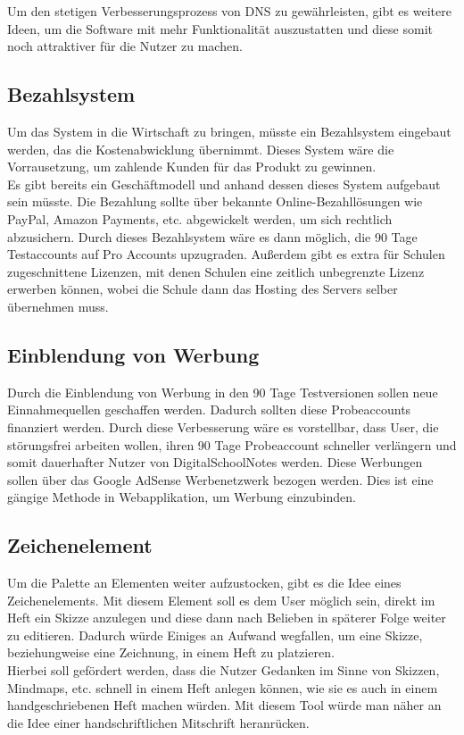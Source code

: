 Um den stetigen Verbesserungsprozess von DNS zu gewährleisten, gibt es weitere Ideen, um die Software mit mehr Funktionalität auszustatten und diese somit noch attraktiver für die Nutzer zu machen. 

\subsection{Bezahlsystem}
Um das System in die Wirtschaft zu bringen, müsste ein Bezahlsystem eingebaut werden, das die Kostenabwicklung übernimmt. Dieses System wäre die Vorrausetzung, um zahlende Kunden für das Produkt zu gewinnen.\\
Es gibt bereits ein Geschäftmodell und anhand dessen dieses System aufgebaut sein müsste. 
Die Bezahlung sollte über bekannte Online-Bezahllösungen wie PayPal, Amazon Payments, etc. abgewickelt werden, um sich rechtlich abzusichern. Durch dieses Bezahlsystem wäre es dann möglich, die 90 Tage Testaccounts auf Pro Accounts upzugraden. Außerdem gibt es extra für Schulen zugeschnittene Lizenzen, mit denen Schulen eine zeitlich unbegrenzte Lizenz erwerben können, wobei die Schule dann das Hosting des Servers selber übernehmen muss. 

\newpage

\subsection{Einblendung von Werbung}
Durch die Einblendung von Werbung in den 90 Tage Testversionen sollen neue Einnahmequellen geschaffen werden. Dadurch sollten diese Probeaccounts finanziert werden. Durch diese Verbesserung wäre es vorstellbar, dass User, die störungsfrei arbeiten wollen, ihren 90 Tage Probeaccount schneller verlängern und somit dauerhafter Nutzer von DigitalSchoolNotes werden. Diese Werbungen sollen über das Google AdSense Werbenetzwerk bezogen werden. Dies ist eine gängige Methode in Webapplikation, um Werbung einzubinden.
\subsection{Zeichenelement}
Um die Palette an Elementen weiter aufzustocken, gibt es die Idee eines Zeichenelements. Mit diesem Element soll es dem User möglich sein, direkt im Heft ein Skizze anzulegen und diese dann nach Belieben in späterer Folge weiter zu editieren. Dadurch würde Einiges an Aufwand wegfallen, um eine Skizze, beziehungweise eine Zeichnung, in einem Heft zu platzieren.\\
Hierbei soll gefördert werden, dass die Nutzer Gedanken im Sinne von Skizzen, Mindmaps, etc. schnell in einem Heft anlegen können, wie sie es auch in einem handgeschriebenen Heft machen würden. Mit diesem Tool würde man näher an die Idee einer handschriftlichen Mitschrift heranrücken.
